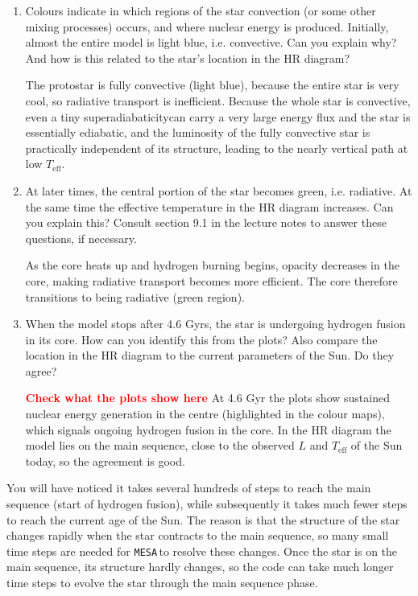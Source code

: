 \documentclass[11pt,a4paper]{article}
\newcommand{\todo}[1]{\textbf{\textcolor{red}{#1}}}
\newcommand{\MESA}{\texttt{MESA}\,}
\begin{document}
\begin{enumerate}
\begin{enumerate}
\item Colours indicate in which regions of the star convection (or some other mixing processes) occurs, and where nuclear energy is produced. Initially, almost the entire model is light blue, i.e. convective. Can you explain why? And how is this related to the star's location in the HR diagram?

{\color{blue} The protostar is fully convective (light blue), because the entire star is very cool, so radiative transport is inefficient. Because the whole star is convective, even a tiny superadiabaticitycan carry a very large energy flux and the star is essentially ediabatic, and the luminosity of the fully convective star is practically independent of its structure, leading to the nearly vertical path at low $T_{\mathrm{eff}}$.}


\item At later times, the central portion of the star becomes green, i.e. radiative. At the same time the effective temperature in the HR diagram increases. Can you explain this? Consult section 9.1 in the lecture notes to answer these questions, if necessary.

{\color{blue} As the core heats up and hydrogen burning begins, opacity decreases in the core, making radiative transport becomes more efficient. The core therefore transitions to being radiative (green region). }


\item When the model stops after 4.6 Gyrs, the star is undergoing hydrogen fusion in its core. How can you identify this from the plots? Also compare the location in the HR diagram to the current parameters of the Sun. Do they agree?

\todo{Check what the plots show here}
{\color{blue} At 4.6 Gyr the plots show sustained nuclear energy generation in the centre (highlighted in the colour maps), which signals ongoing hydrogen fusion in the core. In the HR diagram the model lies on the main sequence, close to the observed $L$ and $T_{\mathrm{eff}}$ of the Sun today, so the agreement is good.}

\end{enumerate}

You will have noticed it takes several hundreds of steps to reach the main sequence (start of hydrogen fusion), while subsequently it takes much fewer steps to reach the current age of the Sun. 
The reason is that the structure of the star changes rapidly when the star contracts to the main sequence, so many small time steps are needed for \MESA to resolve these changes. Once the star is on the main sequence, its structure hardly changes, so the code can take much longer time steps to evolve the star through the main sequence phase.


\end{enumerate}
\end{document}

